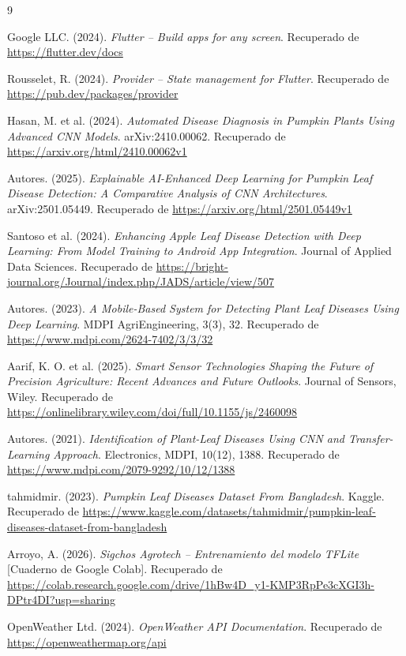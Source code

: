 \documentclass[12pt,a4paper]{article}
\begin{document}
\newpage
{}
\begin{thebibliography}{9}

Google LLC. (2024). \textit{Flutter -- Build apps for any screen}.
Recuperado de \url{https://flutter.dev/docs}

Rousselet, R. (2024). \textit{Provider -- State management for Flutter}.
Recuperado de \url{https://pub.dev/packages/provider}

Hasan, M. et al. (2024). \textit{Automated Disease Diagnosis in Pumpkin Plants
Using Advanced CNN Models}. arXiv:2410.00062.
Recuperado de \url{https://arxiv.org/html/2410.00062v1}

Autores. (2025). \textit{Explainable AI-Enhanced Deep Learning for Pumpkin Leaf
Disease Detection: A Comparative Analysis of CNN Architectures}. arXiv:2501.05449.
Recuperado de \url{https://arxiv.org/html/2501.05449v1}

Santoso et al. (2024). \textit{Enhancing Apple Leaf Disease Detection with Deep
Learning: From Model Training to Android App Integration}. Journal of Applied
Data Sciences.
Recuperado de \url{https://bright-journal.org/Journal/index.php/JADS/article/view/507}

Autores. (2023). \textit{A Mobile-Based System for Detecting Plant Leaf
Diseases Using Deep Learning}. MDPI AgriEngineering, 3(3), 32.
Recuperado de \url{https://www.mdpi.com/2624-7402/3/3/32}

Aarif, K. O. et al. (2025). \textit{Smart Sensor Technologies Shaping the
Future of Precision Agriculture: Recent Advances and Future Outlooks}. Journal
of Sensors, Wiley.
Recuperado de \url{https://onlinelibrary.wiley.com/doi/full/10.1155/js/2460098}

Autores. (2021). \textit{Identification of Plant-Leaf Diseases Using CNN and
Transfer-Learning Approach}. Electronics, MDPI, 10(12), 1388.
Recuperado de \url{https://www.mdpi.com/2079-9292/10/12/1388}

tahmidmir. (2023). \textit{Pumpkin Leaf Diseases Dataset From Bangladesh}.
Kaggle.
Recuperado de \url{https://www.kaggle.com/datasets/tahmidmir/pumpkin-leaf-diseases-dataset-from-bangladesh}

Arroyo, A. (2026). \textit{Sigchos Agrotech -- Entrenamiento del modelo TFLite}
[Cuaderno de Google Colab].
Recuperado de \url{https://colab.research.google.com/drive/1hBw4D_y1-KMP3RpPe3cXGI3h-DPtr4DI?usp=sharing}

OpenWeather Ltd. (2024). \textit{OpenWeather API Documentation}.
Recuperado de \url{https://openweathermap.org/api}

\end{thebibliography}
\end{document}
